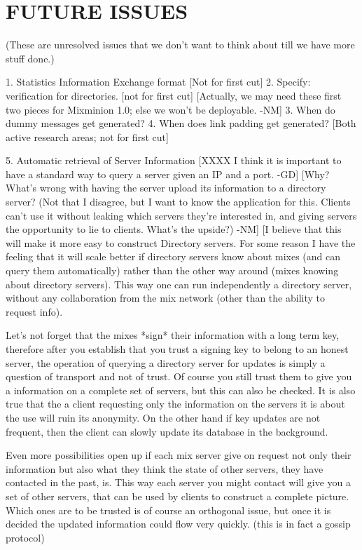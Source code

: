 \section{FUTURE ISSUES}
(These are unresolved issues that we don't want to think about till we
have more stuff done.)

1. Statistics Information Exchange format
   [Not for first cut]
2. Specify: verification for directories.
	[not for first cut]
   [Actually, we may need these first two pieces for Mixminion 1.0;
    else we won't be deployable. -NM]
3. When do dummy messages get generated?
4. When does link padding get generated?
   [Both active research areas; not for first cut]

5. Automatic retrieval of Server Information
[XXXX I think it is important to have a standard way to query a server given 
      an IP and a port. -GD]
[Why? What's wrong with having the server upload its information to a
 directory server? (Not that I disagree, but I want to know the
 application for this.  Clients can't use it without leaking which
 servers they're interested in, and giving servers the opportunity to
 lie to clients.  What's the upside?) -NM]
[I believe that this will make it more easy to construct Directory servers. 
 For some reason I have the feeling that it will scale better if directory 
 servers know about mixes (and can query them automatically) rather than the 
 other way around (mixes knowing about directory servers). This way one can 
 run independently a directory server, without any collaboration from the mix
 network (other than the ability to request info). 

 Let's not forget that the
 mixes *sign* their information with a long term key, therefore after you 
 establish that you trust a signing key to belong to an honest server, the 
 operation of querying a directory server for updates is simply a question 
 of transport and not of trust. Of course you still trust them to give you a 
 information on a complete set of servers, but this can also be checked. 
 It is also true that the a client requesting only the information on the 
 servers it is about the use will ruin its anonymity. On the other hand if key
 updates are not frequent, then the client can slowly update its database in 
 the background.

 Even more possibilities open up if each mix server give on request not only 
 their information but also what they think the state of other servers, they 
 have contacted in the past, is. This way each server you might contact will 
 give you a set of other servers, that can be used by clients to construct a 
 complete picture. Which ones are to be trusted is of course an orthogonal 
 issue, but once it is decided the updated information could flow very 
 quickly. (this is in fact a gossip protocol)

